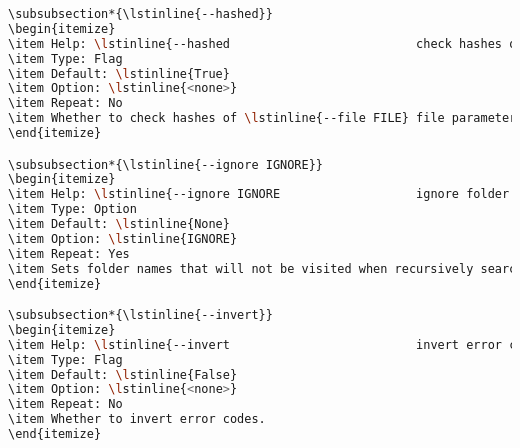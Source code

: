 \begin{snugshade}
\begin{lstlisting}[language=bash]
\subsubsection*{\lstinline{--hashed}}
\begin{itemize}
\item Help: \lstinline{--hashed                          check hashes of unknown files}
\item Type: Flag
\item Default: \lstinline{True}
\item Option: \lstinline{<none>}
\item Repeat: No
\item Whether to check hashes of \lstinline{--file FILE} file parameters. Prevents untrusted code from executing by accident.
\end{itemize}

\subsubsection*{\lstinline{--ignore IGNORE}}
\begin{itemize}
\item Help: \lstinline{--ignore IGNORE                   ignore folder names}
\item Type: Option
\item Default: \lstinline{None}
\item Option: \lstinline{IGNORE}
\item Repeat: Yes
\item Sets folder names that will not be visited when recursively searching file system.
\end{itemize}

\subsubsection*{\lstinline{--invert}}
\begin{itemize}
\item Help: \lstinline{--invert                          invert error codes}
\item Type: Flag
\item Default: \lstinline{False}
\item Option: \lstinline{<none>}
\item Repeat: No
\item Whether to invert error codes.
\end{itemize}


\end{lstlisting}
\end{snugshade}
